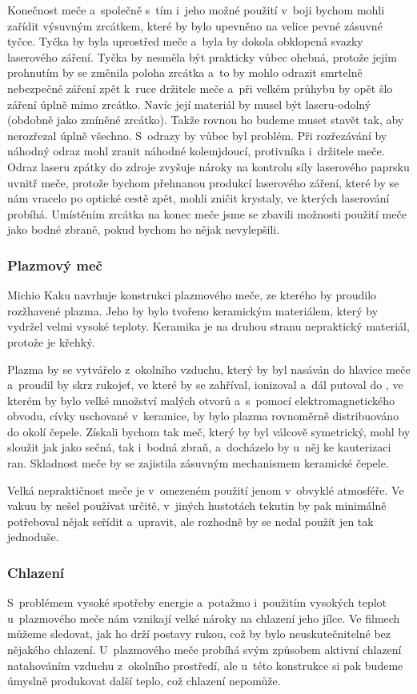 {Konečnost meče a~společně s~tím i~jeho možné použití v~boji bychom mohli zařídit
výsuvným zrcátkem, které by bylo upevněno na velice pevné zásuvné tyčce.
Tyčka by byla uprostřed meče a~byla by dokola obklopená svazky laserového záření.
Tyčka by nesměla být prakticky vůbec ohebná, protože jejím prohnutím by se změnila
poloha zrcátka a~to by mohlo odrazit smrtelně nebezpečné záření zpět k~ruce 
držitele meče a~při velkém průhybu by opět šlo záření úplně mimo zrcátko.
Navíc její materiál by musel být laseru-odolný (obdobně jako zmíněné zrcátko). 
Takže rovnou ho budeme muset stavět tak, aby nerozřezal úplně všechno.
S~odrazy by vůbec byl problém. Při rozřezávání by náhodný odraz mohl zranit 
náhodné kolemjdoucí, protivníka i~držitele meče. Odraz laseru zpátky do zdroje
zvyšuje nároky na kontrolu síly laserového paprsku uvnitř meče, protože 
bychom přehnanou produkcí laserového záření, které by se nám vracelo po 
optické cestě zpět, mohli zničit krystaly, ve kterých laserování probíhá.
Umístěním zrcátka na konec meče 
jsme se zbavili možnosti použití meče jako bodné zbraně, pokud bychom ho nějak 
nevylepšili.

\subsubsection{Plazmový meč}
Michio Kaku navrhuje konstrukci plazmového meče, ze kterého by proudilo rozžhavené
plazma. Jeho  by bylo tvořeno keramickým materiálem, který by vydržel velmi
vysoké teploty. Keramika je na druhou stranu nepraktický materiál, protože je 
křehký.

Plazma by se vytvářelo z~okolního vzduchu, který by byl nasáván do hlavice meče 
a~proudil by skrz rukojeť, ve které by se zahříval, ionizoval a~dál putoval
do , ve kterém by bylo velké množství malých otvorů a~s~pomocí
elektromagnetického obvodu, cívky uschované v~keramice, by bylo plazma rovnoměrně
distribuováno do okolí čepele. Získali bychom tak meč, který by byl válcově 
symetrický, mohl by sloužit jak jako sečná, tak i~bodná zbraň, a~docházelo by u~něj 
ke kauterizaci ran. Skladnost meče by se zajistila zásuvným 
mechanismem keramické čepele.

Velká nepraktičnost meče je v~omezeném použití jenom v~obvyklé atmosféře.
Ve vakuu by nešel používat určitě, v~jiných hustotách tekutin by pak minimálně
potřeboval nějak seřídit a~upravit, ale rozhodně by se nedal použít jen tak 
jednoduše.

\subsubsection{Chlazení}
S~problémem vysoké spotřeby energie a~potažmo i~použitím vysokých teplot 
u~plaz\-mového meče nám vznikají velké nároky na chlazení jeho jílce. Ve filmech
můžeme sledovat, jak ho drží postavy rukou, což by bylo neuskutečnitelné 
bez nějakého chlazení. U~plazmového meče probíhá svým způsobem aktivní
chlazení natahováním vzduchu z~okolního prostředí, ale u~této konstrukce si
pak budeme úmyslně produkovat další teplo, což chlazení nepomůže.

}
